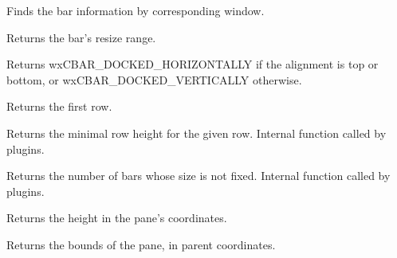 
Finds the bar information by corresponding window.


\label{cbdockpanegetbarresizerange}


Returns the bar's resize range.


\label{cbdockpanegetdockingstate}


Returns wxCBAR\_DOCKED\_HORIZONTALLY if the alignment is top or bottom,
or wxCBAR\_DOCKED\_VERTICALLY otherwise.


\label{cbdockpanegetfirstrow}


Returns the first row.


\label{cbdockpanegetminimalrowheight}


Returns the minimal row height for the given row.
Internal function called by plugins.


\label{cbdockpanegetnotfixedbarscount}


Returns the number of bars whose size is not fixed.
Internal function called by plugins.


\label{cbdockpanegetpaneheight}


Returns the height in the pane's coordinates.


\label{cbdockpanegetrealrect}


Returns the bounds of the pane, in parent coordinates.


\label{cbdockpanegetrow}


